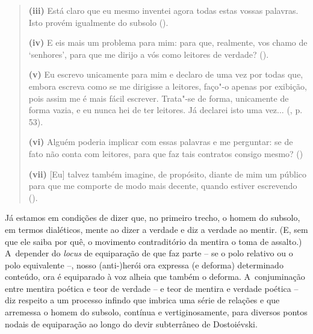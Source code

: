 {\begin{quote}
\textbf{(iii)} Está claro que eu mesmo inventei agora todas estas vossas
palavras. Isto provém igualmente do subsolo ().

\textbf{(iv)} E eis mais um problema para mim: para que, realmente, vos
chamo de `senhores', para que me dirijo a vós como leitores de verdade?
().

\textbf{(v)} Eu escrevo unicamente para mim e declaro de uma vez por
todas que, embora escreva como se me dirigisse a leitores, faço"-o apenas
por exibição, pois assim me é mais fácil escrever. Trata"-se de forma,
unicamente de forma vazia, e eu nunca hei de ter leitores. Já declarei
isto uma vez... (, p. 53).

\textbf{(vi)} Alguém poderia implicar com essas palavras e me perguntar:
se de fato não conta com leitores, para que faz tais contratos consigo
mesmo? ()

\textbf{(vii)} {[}Eu{]} talvez também imagine, de propósito, diante de
mim um público para que me comporte de modo mais decente, quando estiver
escrevendo ().
\end{quote}

Já estamos em condições de dizer que, no primeiro trecho, o homem do
subsolo, em termos dialéticos, mente ao dizer a verdade e diz a verdade
ao mentir. (E, sem que ele saiba por quê, o movimento contraditório da
mentira o toma de assalto.) A~depender do \emph{locus} de equiparação de
que faz parte -- se o polo relativo ou o polo equivalente --, nosso
(anti-)herói ora expressa (e deforma) determinado conteúdo, ora é
equiparado à voz alheia que também o deforma. A~conjuminação entre
mentira poética e teor de verdade -- e teor de mentira e verdade poética
-- diz respeito a um processo infindo que imbrica uma série de relações
e que arremessa o homem do subsolo, contínua e vertiginosamente, para
diversos pontos nodais de equiparação ao longo do devir subterrâneo de
Dostoiévski.

}
